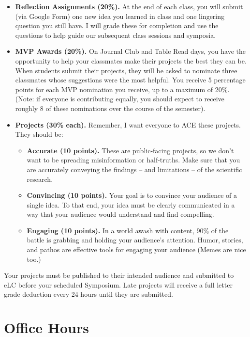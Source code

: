 \documentclass[11pt, letterpaper]{article}
\begin{document}
\begin{itemize}
	\item \textbf{Reflection Assignments (20\%).} At the end of each class, you will submit (via Google Form) one new idea you learned in class and one lingering question you still have. I will grade these for completion and use the questions to help guide our subsequent class sessions and symposia.
	\item \textbf{MVP Awards (20\%).} On Journal Club and Table Read days, you have the opportunity to help your classmates make their projects the best they can be. When students submit their projects, they will be asked to nominate three classmates whose suggestions were the most helpful. You receive 5 percentage points for each MVP nomination you receive, up to a maximum of 20\%. (Note: if everyone is contributing equally, you should expect to receive roughly 8 of these nominations over the course of the semester).
	\item \textbf{Projects (30\% each).} Remember, I want everyone to ACE these projects. They should be:
		\begin{itemize}
			\item \textbf{Accurate (10 points).} These are public-facing projects, so we don't want to be spreading misinformation or half-truths. Make sure that you are accurately conveying the findings -- and limitations -- of the scientific research.
			\item \textbf{Convincing (10 points).} Your goal is to convince your audience of a single idea. To that end, your idea must be clearly communicated in a way that your audience would understand and find compelling.
			\item \textbf{Engaging (10 points).} In a world awash with content, 90\% of the battle is grabbing and holding your audience's attention. Humor, stories, and pathos are effective tools for engaging your audience (Memes are nice too.)
		\end{itemize}
\end{itemize}

\noindent Your projects must be published to their intended audience and submitted to eLC before your scheduled Symposium. Late projects will receive a full letter grade deduction every 24 hours until they are submitted.

\section*{Office Hours}
\end{document}
